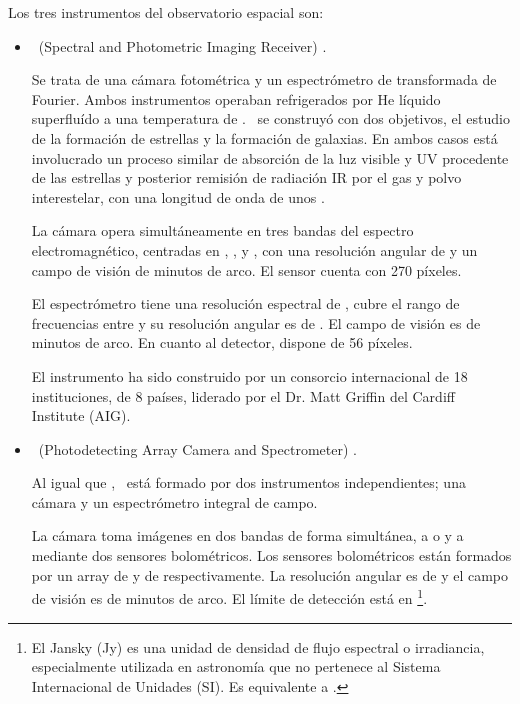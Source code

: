 Los tres instrumentos del observatorio espacial son:

\vspace{-3mm}
\begin{itemize}
    
    \item \spire\ (Spectral and Photometric Imaging Receiver) \cite{website:spire_website}.
    
    Se trata de una cámara fotométrica y un espectrómetro de transformada de Fourier. Ambos instrumentos operaban refrigerados por He líquido superfluído a una temperatura de . \spire\ se construyó con dos objetivos, el estudio de la formación de estrellas y la formación de galaxias. En ambos casos está involucrado un proceso similar de absorción de la luz visible y UV procedente de las estrellas y posterior remisión de radiación IR por el gas y polvo interestelar, con una longitud de onda de unos .
    
    La cámara opera simultáneamente en tres bandas del espectro electromagnético, centradas en , , y , con una resolución angular de  y un campo de visión de  minutos de arco. El sensor cuenta con 270 píxeles.
    
    El espectrómetro tiene una resolución espectral de , cubre el rango de frecuencias entre    y su resolución angular es de . El campo de visión es de  minutos de arco. En cuanto al detector, dispone de 56 píxeles.
     
    El instrumento ha sido construido por un consorcio internacional de 18 instituciones, de 8 países, liderado por el Dr. Matt Griffin del Cardiff Institute (AIG)\citep{website:h_instrumets}.
    
    \item \pacs\ (Photodetecting Array Camera and Spectrometer) \citep{website:pacs_website}.
    
    Al igual que \spire, \pacs\ está formado por dos instrumentos independientes; una cámara y un espectrómetro integral de campo. 
    
    La cámara toma imágenes en dos bandas de forma simultánea, a  o  y a  mediante dos sensores bolométricos. Los sensores bolométricos están formados por un array de  y de  respectivamente. La resolución angular es de  y el campo de visión es de  minutos de arco. El límite de detección está en \footnote{El Jansky (Jy) es una unidad de densidad de flujo espectral o irradiancia, especialmente utilizada en astronomía que no pertenece al Sistema Internacional de Unidades (SI). Es equivalente a .}.
    

\end{itemize}
